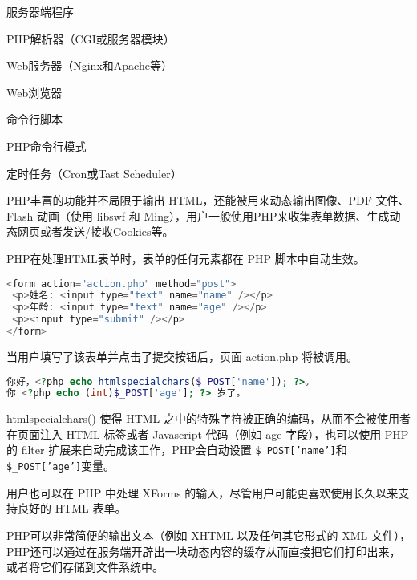 \begin{compactenum}
\item 服务器端程序

\begin{compactitem}
\item PHP解析器（CGI或服务器模块）
\item Web服务器（Nginx和Apache等）
\item Web浏览器
\end{compactitem}

\item 命令行脚本

\begin{compactitem}
\item PHP命令行模式
\item 定时任务（Cron或Tast Scheduler）
\end{compactitem}

\end{compactenum}

PHP丰富的功能并不局限于输出 HTML，还能被用来动态输出图像、PDF 文件、Flash 动画（使用 libswf 和 Ming），用户一般使用PHP来收集表单数据、生成动态网页或者发送/接收Cookies等。

PHP在处理HTML表单时，表单的任何元素都在 PHP 脚本中自动生效。

\begin{lstlisting}[language=PHP]
<form action="action.php" method="post">
 <p>姓名: <input type="text" name="name" /></p>
 <p>年龄: <input type="text" name="age" /></p>
 <p><input type="submit" /></p>
</form>
\end{lstlisting}

当用户填写了该表单并点击了提交按钮后，页面 action.php 将被调用。


\begin{lstlisting}[language=PHP]
你好，<?php echo htmlspecialchars($_POST['name']); ?>。
你 <?php echo (int)$_POST['age']; ?> 岁了。
\end{lstlisting}

htmlspecialchars() 使得 HTML 之中的特殊字符被正确的编码，从而不会被使用者在页面注入 HTML 标签或者 Javascript 代码（例如 age 字段），也可以使用 PHP 的 filter 扩展来自动完成该工作，PHP会自动设置 \texttt{\$\_POST['name']}和\texttt{\$\_POST['age']}变量。

用户也可以在 PHP 中处理 XForms 的输入，尽管用户可能更喜欢使用长久以来支持良好的 HTML 表单。

PHP可以非常简便的输出文本（例如 XHTML 以及任何其它形式的 XML 文件），PHP还可以通过在服务端开辟出一块动态内容的缓存从而直接把它们打印出来，或者将它们存储到文件系统中。




